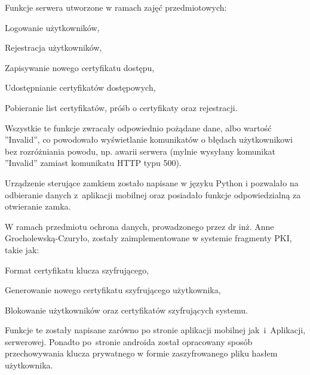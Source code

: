    Funkcje serwera utworzone w ramach zajęć przedmiotowych:
   	\begin{itemize*}
   		\item Logowanie użytkowników,
   		\item Rejestracja użytkowników,
   		\item Zapisywanie nowego certyfikatu dostępu,
   		\item Udostępnianie certyfikatów dostępowych,
   		\item Pobieranie list certyfikatów, próśb o certyfikaty oraz rejestracji.
   	\end{itemize*}
   
	Wszystkie te funkcje zwracały odpowiednio pożądane dane, albo wartość ''Invalid'', co powodowało wyświetlanie komunikatów o błędach użytkownikowi bez rozróżniania powodu, np. awarii serwera (mylnie wysyłany komunikat ''Invalid'' zamiast komunikatu HTTP typu 500).
	
	Urządzenie sterujące zamkiem zostało napisane w języku Python i pozwalało na odbieranie danych z~aplikacji mobilnej oraz posiadało funkcje odpowiedzialną za otwieranie zamka.

	W ramach przedmiotu ochrona danych, prowadzonego przez dr inż. Anne Grocholewską-Czuryło, zostały zaimplementowane w systemie fragmenty PKI, takie jak:
	   \begin{itemize*}
	   	\item Format certyfikatu klucza szyfrującego,
	   	\item Generowanie nowego certyfikatu szyfrującego użytkownika,
	   	\item Blokowanie użytkowników oraz certyfikatów szyfrujących systemu.
	   \end{itemize*}
   
	 Funkcje te zostały napisane zarówno po stronie aplikacji mobilnej jak~i~Aplikacji, serwerowej. Ponadto po~stronie androida został opracowany sposób przechowywania klucza prywatnego w formie zaszyfrowanego pliku hasłem użytkownika.
